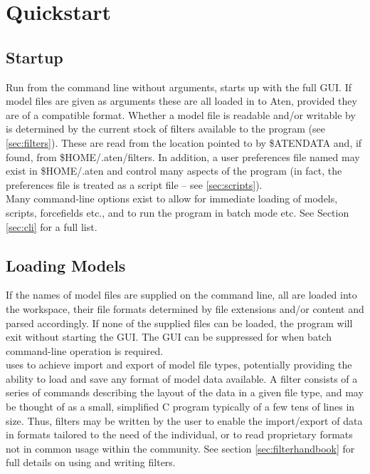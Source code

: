 \chapter{Quickstart}

\section{Startup}
\label{sec:startup}
Run from the command line without arguments, \progname{} starts up with the full GUI. If model files are given as arguments these are all loaded in to Aten, provided they are of a compatible format. Whether a model file is readable and/or writable by \progname{} is determined by the current stock of filters available to the program (see \ref{sec:filters}). These are read from the location pointed to by \$ATENDATA and, if found, from \$HOME/.aten/filters. In addition, a user preferences file named  may exist in \$HOME/.aten and control many aspects of the program (in fact, the preferences file is treated as a script file -- see \ref{sec:scripts}).\\

Many command-line options exist to allow for immediate loading of models, scripts, forcefields etc., and to run the program in batch mode etc. See Section \ref{sec:cli} for a full list.\\

\section{Loading Models}
\label{sec:loadit}

If the names of model files are supplied on the command line, all are loaded into the workspace, their file formats determined by file extensions and/or content and parsed accordingly. If none of the supplied files can be loaded, the program will exit without starting the GUI. The GUI can be suppressed for when batch command-line operation is required.\\

\progname{} uses  to achieve import and export of model file types, potentially providing the ability to load and save any format of model data available. A filter consists of a series of commands describing the layout of the data in a given file type, and may be thought of as a small, simplified C program typically of a few tens of lines in size. Thus, filters may be written by the user to enable the import/export of data in formats tailored to the need of the individual, or to read proprietary formats not in common usage within the community. See section \ref{sec:filterhandbook} for full details on using and writing filters. \\



